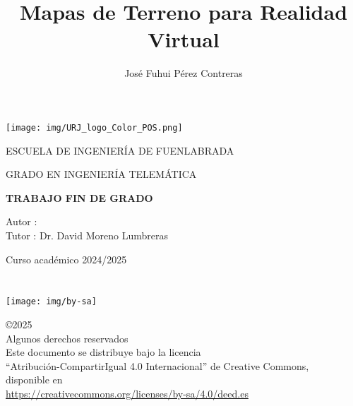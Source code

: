 \documentclass[a4paper, 12pt]{book}
\title{Mapas de Terreno para Realidad Virtual}
\author{José Fuhui Pérez Contreras}
\makeatletter
\let\thetitle\@title
\let\theauthor\@author
\makeatother
\begin{document}
\renewcommand{\refname}{Bibliografía}  %
\renewcommand{\appendixname}{Apéndice}



\begin{titlepage}
\begin{center}
\texttt{[image: img/URJ\_logo\_Color\_POS.png]}

\vspace{1.75cm}

\LARGE
ESCUELA DE INGENIERÍA DE FUENLABRADA
\vspace{1cm}

\LARGE
GRADO EN INGENIERÍA TELEMÁTICA

\vspace{1cm}
\LARGE
\textbf{TRABAJO FIN DE GRADO}

\vspace{2cm}

\Large
\MakeUppercase{\thetitle}

\vspace{2cm}

\large
Autor : \theauthor \\
Tutor : Dr. David Moreno Lumbreras\\
\vspace{1cm}

\large
Curso académico 2024/2025

\end{center}
\end{titlepage}

\newpage
\mbox{}
\thispagestyle{empty} %



\clearpage
{}
\chapter*{}

\vspace{12cm}


\begin{flushright}
\texttt{[image: img/by-sa]}

\noindent©2025 \theauthor  \\
Algunos derechos reservados  \\
Este documento se distribuye bajo la licencia \\
``Atribución-CompartirIgual 4.0 Internacional'' de Creative Commons, \\
disponible en \\
\url{https://creativecommons.org/licenses/by-sa/4.0/deed.es}
\end{flushright}
\end{document}
